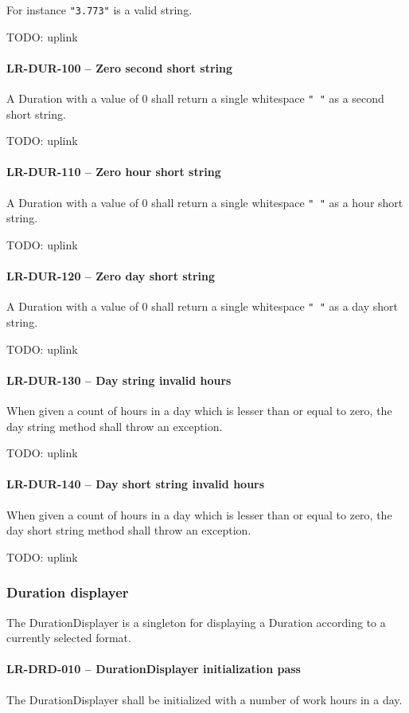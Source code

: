 For instance \lstinline{"3.773"} is a valid string.

TODO: uplink
\paragraph{LR-DUR-100 -- Zero second short string}
A Duration with a value of 0 shall return a single whitespace
\lstinline{" "} as a second short string.

TODO: uplink
\paragraph{LR-DUR-110 -- Zero hour short string}
A Duration with a value of 0 shall return a single whitespace
\lstinline{" "} as a hour short string.

TODO: uplink
\paragraph{LR-DUR-120 -- Zero day short string}
A Duration with a value of 0 shall return a single whitespace
\lstinline{" "} as a day short string.

TODO: uplink
\paragraph{LR-DUR-130 -- Day string invalid hours}
When given a count of hours in a day which is lesser than or equal to zero,
the day string method shall throw an exception.

TODO: uplink
\paragraph{LR-DUR-140 -- Day short string invalid hours}
When given a count of hours in a day which is lesser than or equal to zero,
the day short string method shall throw an exception.

TODO: uplink
\subsubsection{Duration displayer}
The DurationDisplayer is a singleton for displaying a Duration according
to a currently selected format.

\paragraph{LR-DRD-010 -- DurationDisplayer initialization pass}
The DurationDisplayer shall be initialized with a number of work hours
in a day.

